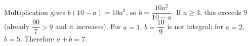 Multiplication gives $b(10-a)=10a^2$, so $b=\dfrac{10a^2}{10-a}$. If $a\ge3$, this exceeds $9$ (already $\dfrac{90}{7}>9$ and it increases). For $a=1$, $b=\dfrac{10}{9}$ is not integral; for $a=2$, $b=5$. Therefore $\boxed{a+b=7}$.
